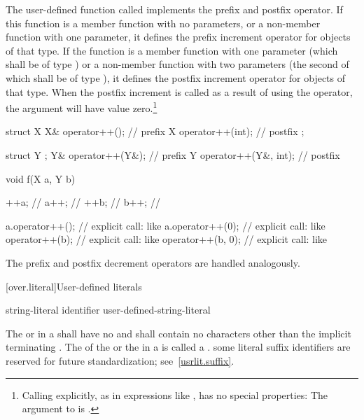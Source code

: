 \pnum
The user-defined function called
implements the prefix and postfix
\tcode{++}
operator.
If this function is a member function with no parameters, or a non-member
function with one parameter,
it defines the prefix increment operator
\tcode{++}
for objects of that type.
If the function is a member function with one parameter (which shall be of type
)
or a non-member function with two parameters (the second of which shall be of type
),
it defines the postfix increment operator
\tcode{++}
for objects of that type.
When the postfix increment is called as a result of using the
\tcode{++}
operator, the
argument will have value zero.\footnote{Calling
explicitly, as in expressions like
,
has no special properties:
The argument to
is
.}
\enterexample

\begin{codeblock}
struct X {
  X&   operator++();            // prefix 
  X    operator++(int);         // postfix 
};

struct Y { };
Y&   operator++(Y&);            // prefix 
Y    operator++(Y&, int);       // postfix 

void f(X a, Y b) {
  ++a;                          // 
  a++;                          // 
  ++b;                          // 
  b++;                          // 

  a.operator++();               // explicit call: like 
  a.operator++(0);              // explicit call: like 
  operator++(b);                // explicit call: like 
  operator++(b, 0);             // explicit call: like 
}
\end{codeblock}
\exitexample

\pnum
The prefix and postfix decrement operators
\tcode{-{-}}
are handled analogously.

[over.literal]{User-defined literals}%
%

\begin{bnf}
\br
     string-literal identifier\br
     user-defined-string-literal
\end{bnf}

\pnum
The  or 
in a  shall have no
 and shall contain no characters other than the
implicit terminating .
The  of the  or
the  in a  is called a
.
\enternote some literal suffix identifiers are reserved for future standardization;
see~\ref{usrlit.suffix}. \exitnote

